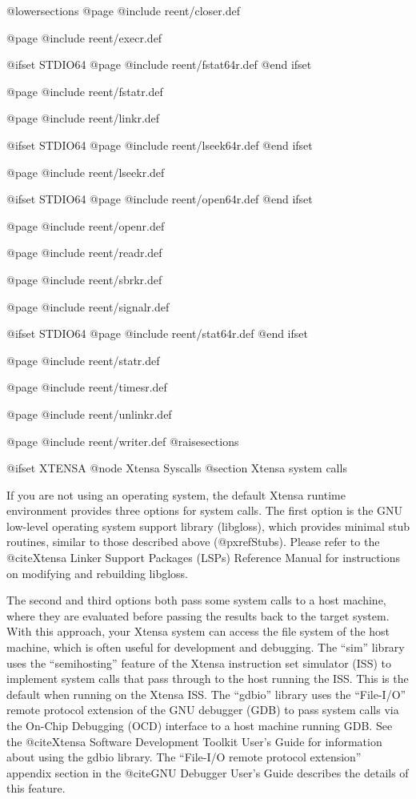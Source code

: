 @lowersections
@page
@include reent/closer.def

@page
@include reent/execr.def

@ifset STDIO64
@page
@include reent/fstat64r.def
@end ifset

@page
@include reent/fstatr.def

@page
@include reent/linkr.def

@ifset STDIO64
@page
@include reent/lseek64r.def
@end ifset

@page
@include reent/lseekr.def

@ifset STDIO64
@page
@include reent/open64r.def
@end ifset

@page
@include reent/openr.def

@page
@include reent/readr.def

@page
@include reent/sbrkr.def

@page
@include reent/signalr.def

@ifset STDIO64
@page
@include reent/stat64r.def
@end ifset

@page
@include reent/statr.def

@page
@include reent/timesr.def

@page
@include reent/unlinkr.def

@page
@include reent/writer.def
@raisesections

@ifset XTENSA
@node Xtensa Syscalls
@section Xtensa system calls

If you are not using an operating system, the default Xtensa runtime
environment provides three options for system calls.  The first option
is the GNU low-level operating system support library (libgloss),
which provides minimal stub routines, similar to those described above
(@pxref{Stubs}).  Please refer to the @cite{Xtensa Linker Support
Packages (LSPs) Reference Manual} for instructions on modifying and
rebuilding libgloss.

The second and third options both pass some system calls to a host machine,
where they are evaluated before passing the results back to the target
system.  With this approach, your Xtensa system can access the file system
of the host machine, which is often useful for development and debugging.
The ``sim'' library uses the ``semihosting'' feature of the Xtensa
instruction set simulator (ISS) to implement system calls that pass through
to the host running the ISS.  This is the default when running on the
Xtensa ISS.  The ``gdbio'' library uses the ``File-I/O'' remote protocol
extension of the GNU debugger (GDB) to pass system calls via the On-Chip
Debugging (OCD)
interface to a host machine running GDB.  See the @cite{Xtensa Software
Development Toolkit User's Guide} for information about using the gdbio
library.  The ``File-I/O remote protocol extension'' appendix section in the
@cite{GNU Debugger User's Guide} describes the details of this feature.

